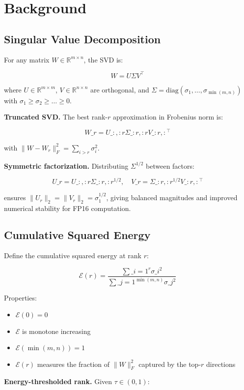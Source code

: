 
\section{Background}

\subsection{Singular Value Decomposition}

For any matrix $W \in \mathbb{R}^{m \times n}$, the SVD is:

\[
W = U \Sigma V^\top
\tag{3.1}
\]

where $U \in \mathbb{R}^{m \times m}$, $V \in \mathbb{R}^{n \times n}$ are 
orthogonal, and $\Sigma = \mathrm{diag}(\sigma_1, \dots, \sigma_{\min(m,n)})$ 
with $\sigma_1 \geq \sigma_2 \geq \dots \geq 0$.

\textbf{Truncated SVD.} The best rank-$r$ approximation in Frobenius norm is:

\[
W\_r = U\_{:, :r} \Sigma\_{:r, :r} V\_{:r, :}^\top
\tag{3.2}
\]

with $\|W - W_r\|_F^2 = \sum_{i > r} \sigma_i^2$.

\textbf{Symmetric factorization.} Distributing $\Sigma^{1/2}$ between factors:

\[
U\_r = U\_{:, :r} \Sigma\_{:r, :r}^{1/2}, \quad
V\_r = \Sigma\_{:r, :r}^{1/2} V\_{:r, :}^\top
\tag{3.3}
\]

ensures $\|U_r\|_2 = \|V_r\|_2 = \sigma_1^{1/2}$, giving balanced magnitudes 
and improved numerical stability for FP16 computation.

\subsection{Cumulative Squared Energy}

Define the cumulative squared energy at rank $r$:

\[
\mathcal{E}(r) = \frac{\sum\_{i=1}^{r} \sigma\_i^2}{\sum\_{j=1}^{\min(m,n)} \sigma\_j^2}
\tag{3.4}
\]

Properties:
\begin{itemize}
\item $\mathcal{E}(0) = 0$
\item $\mathcal{E}$ is monotone increasing
\item $\mathcal{E}(\min(m, n)) = 1$
\item $\mathcal{E}(r)$ measures the fraction of $\|W\|_F^2$ captured by the top-$r$ directions

\end{itemize}
\textbf{Energy-thresholded rank.} Given $\tau \in (0, 1)$:

